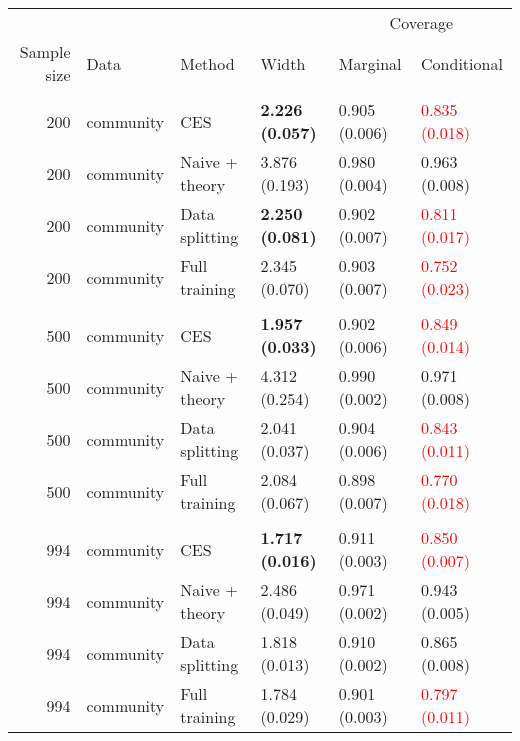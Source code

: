 
\begin{tabular}[t]{rlllll}
\toprule
\multicolumn{4}{c}{ } & \multicolumn{2}{c}{Coverage} \\
\cmidrule(l{3pt}r{3pt}){5-6}
Sample size & Data & Method & Width & Marginal & Conditional\\
\midrule
\addlinespace[0.3em]
\multicolumn{6}{l}{\textbf{200}}\\
\hspace{1em}200 & community & CES & \textbf{2.226 (0.057)} & 0.905 (0.006) & \textcolor{red}{0.835 (0.018)}\\
\hspace{1em}200 & community & Naive + theory & 3.876 (0.193) & 0.980 (0.004) & 0.963 (0.008)\\
\hspace{1em}200 & community & Data splitting & \textbf{2.250 (0.081)} & 0.902 (0.007) & \textcolor{red}{0.811 (0.017)}\\
\hspace{1em}200 & community & Full training & 2.345 (0.070) & 0.903 (0.007) & \textcolor{red}{0.752 (0.023)}\\
\addlinespace[0.3em]
\multicolumn{6}{l}{\textbf{500}}\\
\hspace{1em}500 & community & CES & \textbf{1.957 (0.033)} & 0.902 (0.006) & \textcolor{red}{0.849 (0.014)}\\
\hspace{1em}500 & community & Naive + theory & 4.312 (0.254) & 0.990 (0.002) & 0.971 (0.008)\\
\hspace{1em}500 & community & Data splitting & 2.041 (0.037) & 0.904 (0.006) & \textcolor{red}{0.843 (0.011)}\\
\hspace{1em}500 & community & Full training & 2.084 (0.067) & 0.898 (0.007) & \textcolor{red}{0.770 (0.018)}\\
\addlinespace[0.3em]
\multicolumn{6}{l}{\textbf{994}}\\
\hspace{1em}994 & community & CES & \textbf{1.717 (0.016)} & 0.911 (0.003) & \textcolor{red}{0.850 (0.007)}\\
\hspace{1em}994 & community & Naive + theory & 2.486 (0.049) & 0.971 (0.002) & 0.943 (0.005)\\
\hspace{1em}994 & community & Data splitting & 1.818 (0.013) & 0.910 (0.002) & 0.865 (0.008)\\
\hspace{1em}994 & community & Full training & 1.784 (0.029) & 0.901 (0.003) & \textcolor{red}{0.797 (0.011)}\\
\bottomrule
\end{tabular}

